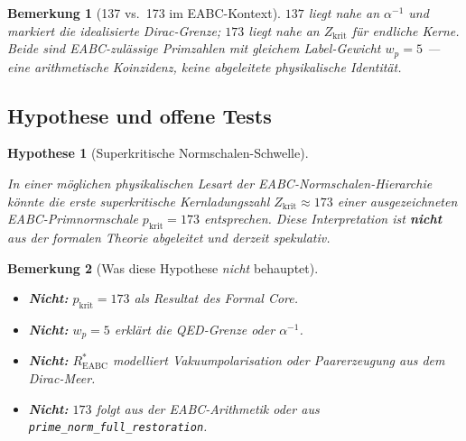 \documentclass[11pt,a4paper]{article}
\newtheorem{remark}{Bemerkung}
\newtheorem{hypothesis}{Hypothese}
\begin{document}
	\begin{remark}[137 vs.\ 173 im EABC-Kontext]
		$137$ liegt nahe an $\alpha^{-1}$ und markiert die idealisierte Dirac-Grenze;
		$173$ liegt nahe an $Z_{\mathrm{krit}}$ für endliche Kerne.
		Beide sind EABC-zulässige Primzahlen mit gleichem Label-Gewicht $w_p=5$ ---
		eine \emph{arithmetische} Koinzidenz, keine abgeleitete physikalische Identität.
	\end{remark}
	
	\subsection{Hypothese und offene Tests}
	\label{sec:supercritical-hypothesis}
	
	\begin{hypothesis}[Superkritische Normschalen-Schwelle]
		\label{hyp:shell-collapse}
		\smallskip
		
		In einer \emph{möglichen} physikalischen Lesart der EABC-Normschalen-Hierarchie
		könnte die erste superkritische Kernladungszahl $Z_{\mathrm{krit}}\approx 173$
		einer ausgezeichneten EABC-Primnormschale $p_{\mathrm{krit}}=173$ entsprechen.
		Diese Interpretation ist \textbf{nicht} aus der formalen Theorie abgeleitet
		und derzeit spekulativ.
	\end{hypothesis}
	
	\begin{remark}[Was diese Hypothese \emph{nicht} behauptet]
		\label{rem:shell-collapse-not}
		\begin{itemize}
			\item \textbf{Nicht:} $p_{\mathrm{krit}}=173$ als \emph{Resultat} des Formal Core.
			\item \textbf{Nicht:} $w_p=5$ erklärt die QED-Grenze oder $\alpha^{-1}$.
			\item \textbf{Nicht:} $R^*_{\mathrm{EABC}}$ modelliert Vakuumpolarisation
			oder Paarerzeugung aus dem Dirac-Meer.
			\item \textbf{Nicht:} $173$ folgt aus der EABC-Arithmetik oder aus
			\texttt{prime\_norm\_full\_restoration}.
		\end{itemize}
	\end{remark}
	
\end{document}
